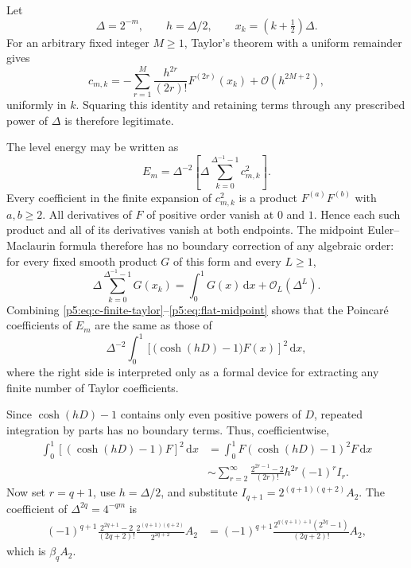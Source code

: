 \documentclass[11pt,oneside]{article}
\theoremstyle{definition}
\newcommand{\dd}{\,\mathrm d}
\newcommand{\bigO}{\mathcal O}
\begin{document}
Let
\begin{equation}
 \Delta=2^{-m},\qquad h=\Delta/2,
 \qquad x_k=(k+\tfrac12)\Delta.                          \label{p5:eq:appendix-delta}
\end{equation}
For an arbitrary fixed integer $M\ge1$, Taylor's theorem with a uniform
remainder gives
\begin{equation}
 c_{m,k}=-\sum_{r=1}^{M}
 \frac{h^{2r}}{(2r)!}F^{(2r)}(x_k)
 +\bigO(h^{2M+2}),                                       \label{p5:eq:c-finite-taylor}
\end{equation}
uniformly in $k$.  Squaring this identity and retaining terms through any
prescribed power of $\Delta$ is therefore legitimate.

The level energy may be written as
\begin{equation}
 E_m=\Delta^{-2}
 \left[\Delta\sum_{k=0}^{\Delta^{-1}-1}c_{m,k}^2\right]. \label{p5:eq:Em-midpoint}
\end{equation}
Every coefficient in the finite expansion of $c_{m,k}^2$ is a product
$F^{(a)}F^{(b)}$ with $a,b\ge2$.  All derivatives of $F$ of positive order
vanish at $0$ and $1$.  Hence each such product and all of its derivatives
vanish at both endpoints.  The midpoint Euler--Maclaurin formula therefore
has no boundary correction of any algebraic order: for every fixed smooth
product $G$ of this form and every $L\ge1$,
\begin{equation}
 \Delta\sum_{k=0}^{\Delta^{-1}-1}G(x_k)
 =\int_0^1G(x)\dd x+\bigO_L(\Delta^L).                  \label{p5:eq:flat-midpoint}
\end{equation}
Combining \eqref{p5:eq:c-finite-taylor}--\eqref{p5:eq:flat-midpoint} shows that the
Poincaré coefficients of $E_m$ are the same as those of
\begin{equation}
 \Delta^{-2}\int_0^1
 \left[\bigl(\cosh(hD)-1\bigr)F(x)\right]^2\dd x,       \label{p5:eq:operator-asymptotic}
\end{equation}
where the right side is interpreted only as a formal device for extracting
any finite number of Taylor coefficients.

Since $\cosh(hD)-1$ contains only even positive powers of $D$, repeated
integration by parts has no boundary terms.  Thus, coefficientwise,
\begin{align}
 \int_0^1[(\cosh(hD)-1)F]^2\dd x
 &=\int_0^1F(\cosh(hD)-1)^2F\dd x                       \label{p5:eq:operator-square}\\
 &\sim\sum_{r=2}^\infty
 \frac{2^{2r-1}-2}{(2r)!}h^{2r}(-1)^rI_r.               \label{p5:eq:operator-coeff}
\end{align}
Now set $r=q+1$, use $h=\Delta/2$, and substitute
$I_{q+1}=2^{(q+1)(q+2)}A_2$.  The coefficient of
$\Delta^{2q}=4^{-qm}$ is
\begin{align}
 (-1)^{q+1}
 \frac{2^{2q+1}-2}{(2q+2)!}
 \frac{2^{(q+1)(q+2)}}{2^{2q+2}}A_2
 &=(-1)^{q+1}
 \frac{2^{q(q+1)+1}(2^{2q}-1)}{(2q+2)!}A_2,            \label{p5:eq:beta-derivation}
\end{align}
which is $\beta_qA_2$.
\end{document}
